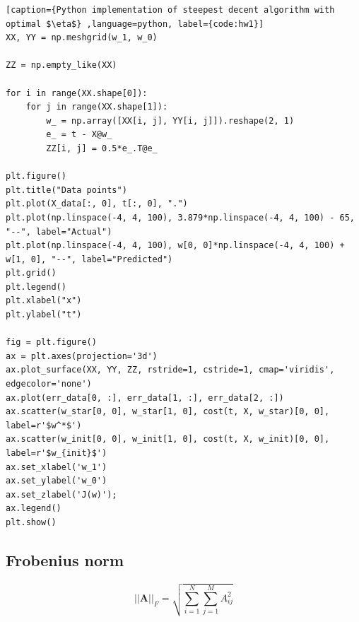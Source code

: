 \documentclass{article}
\begin{document}
\begin{lstlisting}[caption={Python implementation of steepest decent algorithm with optimal $\eta$} ,language=python, label={code:hw1}]
XX, YY = np.meshgrid(w_1, w_0)

ZZ = np.empty_like(XX)

for i in range(XX.shape[0]):
	for j in range(XX.shape[1]):
		w_ = np.array([XX[i, j], YY[i, j]]).reshape(2, 1)	
		e_ = t - X@w_
		ZZ[i, j] = 0.5*e_.T@e_

plt.figure()
plt.title("Data points")
plt.plot(X_data[:, 0], t[:, 0], ".")
plt.plot(np.linspace(-4, 4, 100), 3.879*np.linspace(-4, 4, 100) - 65, "--", label="Actual")
plt.plot(np.linspace(-4, 4, 100), w[0, 0]*np.linspace(-4, 4, 100) + w[1, 0], "--", label="Predicted")
plt.grid()
plt.legend()
plt.xlabel("x")
plt.ylabel("t")

fig = plt.figure()
ax = plt.axes(projection='3d')
ax.plot_surface(XX, YY, ZZ, rstride=1, cstride=1, cmap='viridis', edgecolor='none')
ax.plot(err_data[0, :], err_data[1, :], err_data[2, :])
ax.scatter(w_star[0, 0], w_star[1, 0], cost(t, X, w_star)[0, 0], label=r'$w^*$')
ax.scatter(w_init[0, 0], w_init[1, 0], cost(t, X, w_init)[0, 0], label=r'$w_{init}$')
ax.set_xlabel('w_1')
ax.set_ylabel('w_0')
ax.set_zlabel('J(w)');
ax.legend()
plt.show()
\end{lstlisting}

\subsection*{Frobenius norm}
\begin{equation} \label{eq:fn}
	||\mathbf{A}||_{F} = \sqrt{\sum_{i=1}^N\sum_{j=1}^{M}A^2_{ij}}
\end{equation}
\end{document}
